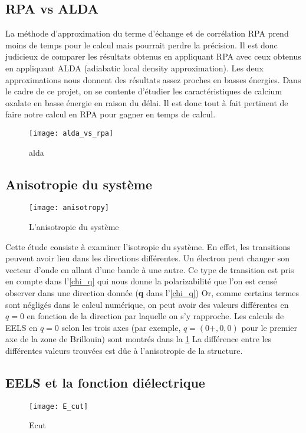 \subsection{RPA vs ALDA}
La méthode d'approximation du terme d'échange et de corrélation RPA prend moins de temps pour le calcul mais pourrait perdre la précision. Il est donc judicieux de comparer les résultats obtenus en appliquant RPA avec ceux obtenus en appliquant ALDA (adiabatic local density approximation).
Les deux approximations nous donnent des résultats assez proches en basses énergies.
Dans le cadre de ce projet, on se contente d'étudier les caractéristiques de calcium oxalate en basse énergie en raison du délai.
Il est donc tout à fait pertinent de faire notre calcul en RPA pour gagner en temps de calcul.
\begin{figure}[!h]
    \centering
    \texttt{[image: alda\_vs\_rpa]}
    \caption{alda}
\end{figure}
\subsection{Anisotropie du système}

\begin{figure}[!h]\label{anisotropie}
    \centering
    \texttt{[image: anisotropy]}
    \caption{L'anisotropie du système}
\end{figure}

Cette étude consiste à examiner l'isotropie du système.
En effet, les transitions peuvent avoir lieu dans les directions différentes.
Un électron peut changer son vecteur d'onde en allant d'une bande à une autre.
Ce type de transition est pris en compte dans l'\cref{chi_q} qui nous donne la polarizabilité que l'on est censé observer dans une direction donnée (\textbf{q} dans l'\cref{chi_q})
Or, comme certains termes sont négligés dans le calcul numérique, on peut avoir des valeurs différentes en $q = 0$ en fonction de la direction par laquelle on s'y rapproche.
Les calculs de EELS en $q = 0$ selon les trois axes (par exemple, $q=(0+,0,0)$ pour le premier axe de la zone de Brillouin) sont montrés dans la \cref{anisotropie}
La différence entre les différentes valeurs trouvées est dûe à l'anisotropie de la structure.
\subsection{EELS et la fonction diélectrique}
\begin{figure}[!h]\label{dispersion}
    \centering
    \texttt{[image: E\_cut]}
    \caption{Ecut}
\end{figure}

